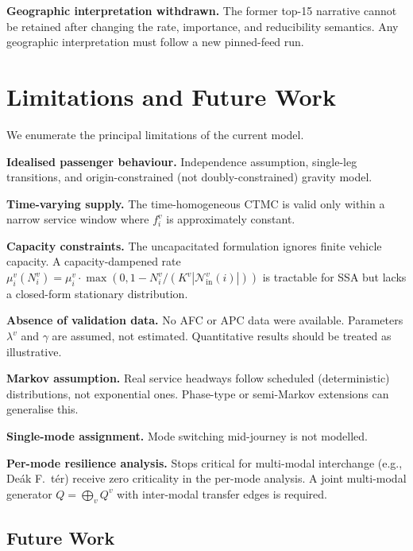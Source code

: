 \documentclass[11pt,a4paper]{article}
\theoremstyle{plain}
\theoremstyle{definition}
\theoremstyle{remark}
\begin{document}
\textbf{Geographic interpretation withdrawn.}  The former top-15 narrative
cannot be retained after changing the rate, importance, and reducibility
semantics.  Any geographic interpretation must follow a new pinned-feed run.


\section{Limitations and Future Work}
\label{sec:limitations}

We enumerate the principal limitations of the current model.

\textbf{Idealised passenger behaviour.}  Independence assumption, single-leg
transitions, and origin-constrained (not doubly-constrained) gravity model.

\textbf{Time-varying supply.}  The time-homogeneous CTMC is valid only within
a narrow service window where $f^v_i$ is approximately constant.

\textbf{Capacity constraints.}  The uncapacitated formulation ignores finite
vehicle capacity.  A capacity-dampened rate
$\mu^v_i(N^v_i)=\mu^v_i\cdot\max(0,1-N^v_i/(K^v|\mathcal{N}^v_{\mathrm{in}}(i)|))$
is tractable for SSA but lacks a closed-form stationary distribution.

\textbf{Absence of validation data.}  No AFC or APC data were available.
Parameters $\lambda^v$ and $\gamma$ are assumed, not estimated.
Quantitative results should be treated as illustrative.

\textbf{Markov assumption.}  Real service headways follow scheduled
(deterministic) distributions, not exponential ones.  Phase-type or
semi-Markov extensions \cite{norris1997} can generalise this.

\textbf{Single-mode assignment.}  Mode switching mid-journey is not modelled.

\textbf{Per-mode resilience analysis.}  Stops critical for multi-modal
interchange (e.g., De\'ak F.~t\'er) receive zero criticality in the
per-mode analysis.  A joint multi-modal generator
$Q=\bigoplus_v Q^v$ with inter-modal transfer edges is required.

\subsection{Future Work}
\end{document}
